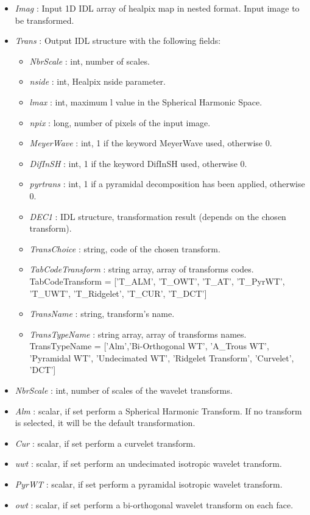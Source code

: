 \begin{itemize}
\item {\em Imag} : Input 1D IDL array of healpix map in nested format. Input image to be transformed.
\item {\em Trans} : Output IDL structure with the following fields:
\begin{itemize}
\item {\em NbrScale} : int, number of scales.
\item {\em nside} : int, Healpix nside parameter.
\item {\em lmax} : int, maximum l value in the Spherical Harmonic Space.
\item {\em npix} : long, number of pixels of the input image.
\item {\em MeyerWave} : int, 1 if the keyword MeyerWave used, otherwise 0.
\item {\em DifInSH} : int, 1 if the keyword DifInSH used, otherwise 0.
\item {\em pyrtrans} : int, 1 if a pyramidal decomposition has been applied, otherwise 0.
\item {\em DEC1} : IDL structure, transformation result (depends on the chosen transform).
\item {\em TransChoice} : string, code of the chosen transform.
\item {\em TabCodeTransform} : string array, array of transforms codes. TabCodeTransform = ['T\_ALM', 'T\_OWT', 'T\_AT', 'T\_PyrWT', 'T\_UWT', 'T\_Ridgelet', 'T\_CUR', 'T\_DCT']
\item {\em TransName} : string, transform's name.
\item {\em TransTypeName} : string array, array of transforms names. 
TransTypeName = ['Alm','Bi-Orthogonal WT', 'A\_Trous WT', 'Pyramidal WT', 'Undecimated WT', 'Ridgelet Transform', 'Curvelet', 'DCT']
\end{itemize}
\item {\em NbrScale} : int, number of scales of the wavelet transforms.
\item {\em Alm} : scalar, if set perform a Spherical Harmonic Transform. If no transform is selected, it will be the default transformation.
\item {\em Cur} : scalar, if set perform a curvelet transform.
\item {\em uwt} : scalar, if set perform an undecimated isotropic wavelet transform.
\item {\em PyrWT} : scalar, if set perform a pyramidal isotropic wavelet transform.
\item {\em owt} : scalar, if set perform a bi-orthogonal wavelet transform on each face.

\end{itemize}
